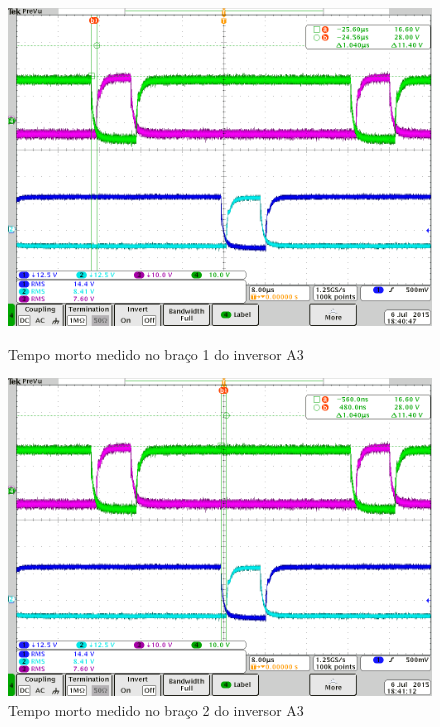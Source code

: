 \documentclass[
	article,			%
	12pt,				%
	twoside,			%
	a4paper,			%
	english,			%
	brazil,				%
	sumario=tradicional
	]{abntex2-modelo-notas-de-aula}
\begin{document}
\begin{figure}[!h]
	\centering
	\begin{minipage}[t]{0.45\textwidth}	\centering
		\includegraphics[width=1\linewidth]{aqs/tek0003}
		\caption{Tempo morto medido no braço 1 do inversor A3}
		\label{fig:tek0003}
	\end{minipage}
	\quad
	\begin{minipage}[t]{0.45\textwidth} 	\centering
		\includegraphics[width=1\linewidth]{aqs/tek0004}
		\caption{Tempo morto medido no braço 2 do inversor A3}
		\label{fig:tek0004}
	\end{minipage}	
\end{figure}
\end{document}
